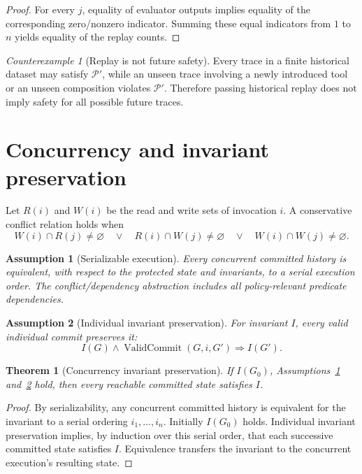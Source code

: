 \documentclass[11pt,a4paper]{article}
\newtheorem{assumption}{Assumption}[section]
\newtheorem{theorem}{Theorem}[section]
\theoremstyle{remark}
\newtheorem{counterexample}{Counterexample}[section]
\begin{document}
\begin{proof}
For every $j$, equality of evaluator outputs implies equality of the corresponding zero/nonzero indicator. Summing these equal indicators from $1$ to $n$ yields equality of the replay counts.
\end{proof}

\begin{counterexample}[Replay is not future safety]
Every trace in a finite historical dataset may satisfy $\mathcal P'$, while an unseen trace involving a newly introduced tool or an unseen composition violates $\mathcal P'$. Therefore passing historical replay does not imply safety for all possible future traces.
\end{counterexample}

\section{Concurrency and invariant preservation}

Let $R(i)$ and $W(i)$ be the read and write sets of invocation $i$. A conservative conflict relation holds when
\[
W(i)\cap R(j)\neq\varnothing
\quad\lor\quad
R(i)\cap W(j)\neq\varnothing
\quad\lor\quad
W(i)\cap W(j)\neq\varnothing.
\]

\begin{assumption}[Serializable execution]\label{a:serial}
Every concurrent committed history is equivalent, with respect to the protected state and invariants, to a serial execution order. The conflict/dependency abstraction includes all policy-relevant predicate dependencies.
\end{assumption}

\begin{assumption}[Individual invariant preservation]\label{a:indpres}
For invariant $I$, every valid individual commit preserves it:
\[
I(G)\land\operatorname{ValidCommit}(G,i,G')
\Rightarrow I(G').
\]
\end{assumption}

\begin{theorem}[Concurrency invariant preservation]\label{thm:serial}
If $I(G_0)$, Assumptions~\ref{a:serial} and~\ref{a:indpres} hold, then every reachable committed state satisfies $I$.
\end{theorem}

\begin{proof}
By serializability, any concurrent committed history is equivalent for the invariant to a serial ordering $i_1,\ldots,i_n$. Initially $I(G_0)$ holds. Individual invariant preservation implies, by induction over this serial order, that each successive committed state satisfies $I$. Equivalence transfers the invariant to the concurrent execution's resulting state.
\end{proof}
\end{document}
